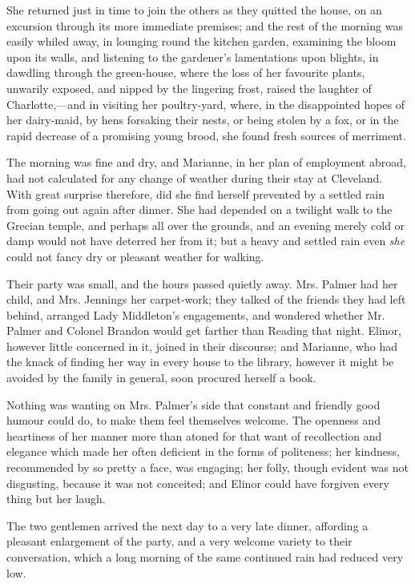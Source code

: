 She returned just in time to join the others as they quitted the house, on an excursion through its more immediate premises; and the rest of the morning was easily whiled away, in lounging round the kitchen garden, examining the bloom upon its walls, and listening to the gardener's lamentations upon blights, in dawdling through the green-house, where the loss of her favourite plants, unwarily exposed, and nipped by the lingering frost, raised the laughter of Charlotte,---and in visiting her poultry-yard, where, in the disappointed hopes of her dairy-maid, by hens forsaking their nests, or being stolen by a fox, or in the rapid decrease of a promising young brood, she found fresh sources of merriment.

The morning was fine and dry, and Marianne, in her plan of employment abroad, had not calculated for any change of weather during their stay at Cleveland. With great surprise therefore, did she find herself prevented by a settled rain from going out again after dinner. She had depended on a twilight walk to the Grecian temple, and perhaps all over the grounds, and an evening merely cold or damp would not have deterred her from it; but a heavy and settled rain even {\em she} could not fancy dry or pleasant weather for walking.

Their party was small, and the hours passed quietly away. Mrs. Palmer had her child, and Mrs. Jennings her carpet-work; they talked of the friends they had left behind, arranged Lady Middleton's engagements, and wondered whether Mr. Palmer and Colonel Brandon would get farther than Reading that night. Elinor, however little concerned in it, joined in their discourse; and Marianne, who had the knack of finding her way in every house to the library, however it might be avoided by the family in general, soon procured herself a book.

Nothing was wanting on Mrs. Palmer's side that constant and friendly good humour could do, to make them feel themselves welcome. The openness and heartiness of her manner more than atoned for that want of recollection and elegance which made her often deficient in the forms of politeness; her kindness, recommended by so pretty a face, was engaging; her folly, though evident was not disgusting, because it was not conceited; and Elinor could have forgiven every thing but her laugh.

The two gentlemen arrived the next day to a very late dinner, affording a pleasant enlargement of the party, and a very welcome variety to their conversation, which a long morning of the same continued rain had reduced very low.

